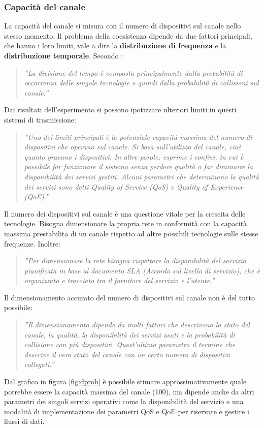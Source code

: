 \documentclass[a4paper]{report} %
\begin{document}
\subsubsection{Capacità del canale} 
La capacità del canale si misura con il numero di dispositivi sul canale nello stesso momento. Il problema della coesistenza dipende da due fattori principali, che hanno i loro limiti, vale a dire la \textbf{distribuzione di frequenza} e la \textbf{distribuzione temporale}. Secondo \cite{art:rif.46}:
\begin{quote}
	\textit{''La divisione del tempo è composta principalmente dalla probabilità di occorrenza delle singole tecnologie e quindi dalla probabilità di collisioni sul canale.''}
\end{quote}
Dai risultati dell'esperimento \cite{art:rif.46} si possono ipotizzare ulteriori limiti in questi sistemi di trasmissione:
\begin{quote}
	\textit{''Uno dei limiti principali è la potenziale capacità massima del numero di dispositivi che operano sul canale. Si basa sull'utilizzo del canale, cioè quanto gravano i dispositivi. In altre parole, esprime i confini, in cui è possibile far funzionare il sistema senza perdere qualità o far diminuire la disponibilità dei servizi gestiti. Alcuni parametri che determinano la qualità dei servizi sono detti Quality of Service (QoS) e Quality of Experience (QoE).''}
\end{quote}
Il numero dei dispositivi sul canale è una questione vitale per la crescita delle tecnologie. Bisogna dimensionare la propria rete in conformità con la capacità massima prestabilita di un canale rispetto ad altre possibili tecnologie sulle stesse frequenze. Inoltre:
\begin{quote}
	\textit{''Per dimensionare la rete bisogna rispettare la disponibilità del servizio pianificata in base al documento SLA (Accordo sul livello di servizio), che è organizzato e tracciato tra il fornitore del servizio e l'utente.''}
\end{quote}
Il dimensionamento accurato del numero di dispositivi sul canale non è del tutto possibile:
\begin{quote}
	\textit{''Il dimensionamento dipende da molti fattori che descrivono lo stato del canale, la qualità, la disponibilità dei servizi usati e la probabilità di collisione con più dispositivi. Quest'ultimo parametro il termine che descrive il vero stato del canale con un certo numero di dispositivi collegati.''}
\end{quote}
Dal grafico in figura \ref{fig:dprob} è possibile stimare approssimativamente quale potrebbe essere la capacità massima del canale (100), ma dipende anche da altri parametri dei singoli servizi operativi come la disponibilità del servizio e una modalità di implementazione dei parametri QoS e QoE per riservare e gestire i flussi di dati. 
\end{document}
